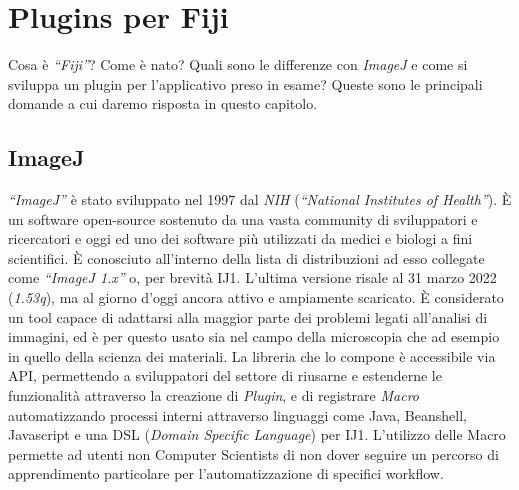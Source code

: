 \chapter{Plugins per Fiji}
\label{chap:plugins}
\noindent Cosa è \textit{``Fiji''}? Come è nato? Quali sono le differenze con \textit{ImageJ} e come si sviluppa un plugin per l'applicativo preso in esame? Queste sono le principali domande a cui daremo risposta in questo capitolo.

\section{ImageJ}
\noindent \textit{``ImageJ''} è stato sviluppato nel 1997 dal \textit{NIH} (\textit{``National Institutes of Health''}). È un software open-source sostenuto da una vasta community di sviluppatori e ricercatori e oggi ed uno dei software più utilizzati da medici e biologi a fini scientifici.
È conosciuto all'interno della lista di distribuzioni ad esso collegate come \textit{``ImageJ 1.x''} o, per brevità IJ1. L'ultima versione risale al 31 marzo 2022 (\textit{1.53q}), ma al giorno d'oggi ancora attivo e ampiamente scaricato. È considerato un tool capace di adattarsi alla maggior parte dei problemi legati all'analisi di immagini, ed è per questo usato sia nel campo della microscopia che ad esempio in quello della scienza dei materiali. La libreria che lo compone è accessibile via API, permettendo a sviluppatori del settore di riusarne e estenderne le funzionalità attraverso la creazione di \textit{Plugin}, e di registrare \textit{Macro} automatizzando processi interni attraverso linguaggi come Java, Beanshell, Javascript e una DSL (\textit{Domain Specific Language}) per IJ1. L'utilizzo delle Macro permette ad utenti non Computer Scientists di non dover seguire un percorso di apprendimento particolare per l'automatizzazione di specifici workflow.

